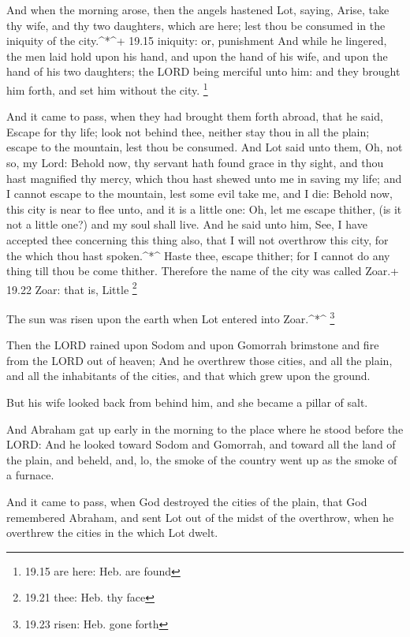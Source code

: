  And when the morning arose, then the angels hastened Lot,
saying, Arise, take thy wife, and thy two daughters, which are here;
lest thou be consumed in the iniquity of the city.\^{}*\^{}+ 19.15
iniquity: or, punishment  And while he lingered, the men
laid hold upon his hand, and upon the hand of his wife, and upon the
hand of his two daughters; the LORD being merciful unto him: and they
brought him forth, and set him without the city. \footnote{19.15 are
  here: Heb. are found}

 And it came to pass, when they had brought them forth
abroad, that he said, Escape for thy life; look not behind thee, neither
stay thou in all the plain; escape to the mountain, lest thou be
consumed.  And Lot said unto them, Oh, not so, my Lord:
 Behold now, thy servant hath found grace in thy sight, and
thou hast magnified thy mercy, which thou hast shewed unto me in saving
my life; and I cannot escape to the mountain, lest some evil take me,
and I die:  Behold now, this city is near to flee unto, and
it is a little one: Oh, let me escape thither, (is it not a little one?)
and my soul shall live.  And he said unto him, See, I have
accepted thee concerning this thing also, that I will not overthrow this
city, for the which thou hast spoken.\^{}*\^{}  Haste thee,
escape thither; for I cannot do any thing till thou be come thither.
Therefore the name of the city was called Zoar.+ 19.22 Zoar: that is,
Little \footnote{19.21 thee: Heb. thy face}

 The sun was risen upon the earth when Lot entered into
Zoar.\^{}*\^{} \footnote{19.23 risen: Heb. gone forth}

 Then the LORD rained upon Sodom and upon Gomorrah
brimstone and fire from the LORD out of heaven;  And he
overthrew those cities, and all the plain, and all the inhabitants of
the cities, and that which grew upon the ground.

 But his wife looked back from behind him, and she became a
pillar of salt.

 And Abraham gat up early in the morning to the place where
he stood before the LORD:  And he looked toward Sodom and
Gomorrah, and toward all the land of the plain, and beheld, and, lo, the
smoke of the country went up as the smoke of a furnace.

 And it came to pass, when God destroyed the cities of the
plain, that God remembered Abraham, and sent Lot out of the midst of the
overthrow, when he overthrew the cities in the which Lot dwelt.

